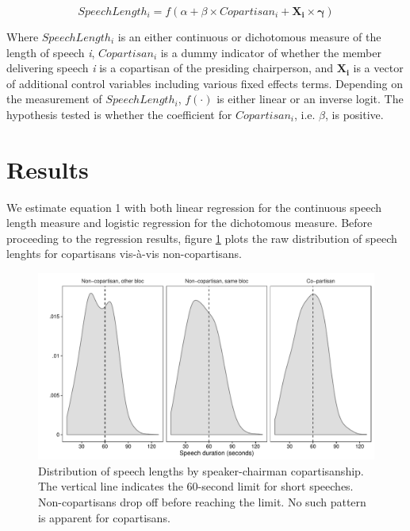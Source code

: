 \documentclass[12pt,a4paper]{article}
\begin{document}
\begin{equation}\label{model}
SpeechLength_i = f( \alpha + \beta \times Copartisan_i + \mathbf{X_i\times\gamma} )
\end{equation}

Where $SpeechLength_i$ is an either continuous or dichotomous measure of the length of speech \textit{i}, $Copartisan_i$ is a dummy indicator of whether the member delivering speech \textit{i} is a copartisan of the presiding chairperson, and $\mathbf{X_i}$ is a vector of additional control variables including various fixed effects terms. Depending on the measurement of $SpeechLength_i$, $f(\cdot)$ is either linear or an inverse logit. The hypothesis tested is whether the coefficient for \textit{$Copartisan_i$}, i.e. \textit{$\beta$}, is positive.

\section{Results}\label{res}

\noindent We estimate equation 1 with both linear regression for the continuous speech length measure and logistic regression for the dichotomous measure. Before proceeding to the regression results, figure \ref{parlbias_dens} plots the raw distribution of speech lenghts for copartisans vis-à-vis non-copartisans.

\begin{figure}[!htbp]
\centering
\includegraphics[scale=.75]{../figures/parlbias_dens}
  \caption{Distribution of speech lengths by speaker-chairman copartisanship. The vertical line indicates the 60-second limit for short speeches. Non-copartisans drop off before reaching the limit. No such pattern is apparent for copartisans.}\label{parlbias_dens}

\end{figure}
\end{document}
